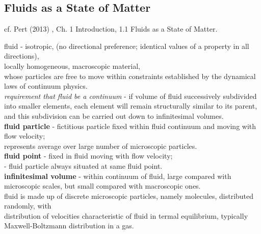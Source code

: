 
\subsection{Fluids as a State of Matter}

cf. Pert (2013) \cite{dgdt:Pert2013}, Ch. 1 Introduction, 1.1 Fluids as a State of Matter.

fluid - isotropic, (no directional preference; identical values of a property in all directions), \\
locally homogeneous, macroscopic material, \\
whose particles are free to move within constraints established by the dynamical laws of continuum physics. \\
\emph{requirement that fluid be a continuum} - if volume of fluid successively subdivided into smaller elements, each element will remain structurally similar to its parent, and this subdivision can be carried out down to infinitesimal volumes. \\

\textbf{fluid particle} - fictitious particle fixed within fluid continuum and moving with flow velocity; \\
represents average over large number of microscopic particles. \\

\textbf{fluid point} - fixed in fluid moving with flow velocity; \\
- fluid particle always situated at same fluid point. \\

\textbf{infinitesimal volume} - within continuum of fluid, large compared with microscopic scales, but small compared with macroscopic ones. \\

fluid is made up of discrete microscopic particles, namely molecules, distributed randomly, with \\
distribution of velocities characteristic of fluid in termal equilibrium, typically Maxwell-Boltzmann distribution in a gas. \\

